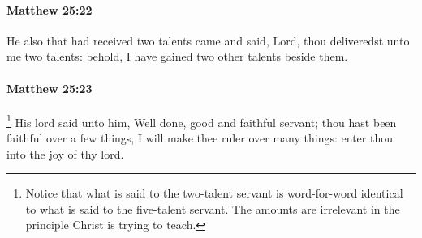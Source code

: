 		\paragraph{Matthew 25:22} %
			\label{MATTHEW-25-22}

			He also that had received two talents came and said, Lord, thou deliveredst unto me two talents: behold, I have gained two other talents beside them.

			\begin{framed}
			\scriptsize
				\begin{compactdesc}
					\item[SBLG] 
				\end{compactdesc}
			\end{framed}

		\paragraph{Matthew 25:23} %
			\label{MATTHEW-25-23}

				\footnote{%
					Notice that what is said to the two-talent servant is word-for-word identical to what is said to the five-talent servant. The amounts are irrelevant in the principle Christ is trying to teach.
					}%
			His lord said unto him, Well done, good and faithful servant; thou hast been faithful over a few things, I will make thee ruler over many things: enter thou into the joy of thy lord.

